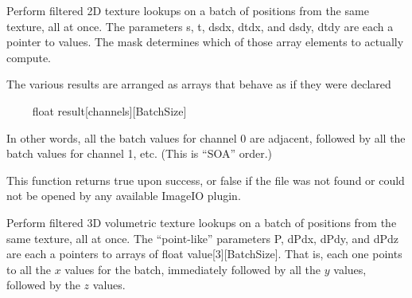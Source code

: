 Perform filtered 2D texture lookups on a batch of positions from the
same texture, all at once.  The parameters {\cf s},
{\cf t}, {\cf dsdx}, {\cf dtdx}, and {\cf dsdy}, {\cf dtdy} are each
a pointer to {\cf [BatchSize]} values.  The {\cf mask} determines which
of those array elements to actually compute.

The various results are arranged as arrays that behave as if they were
declared

~~~~ {\cf  float result[channels][BatchSize]}

\noindent In other words, all the batch values for channel 0 are
adjacent, followed by all the batch values for channel 1, etc. (This is
``SOA'' order.)

This function returns {\cf true} upon success, or {\cf false} if the
file was not found or could not be opened by any available ImageIO
plugin.
\apiend


Perform filtered 3D volumetric texture lookups on a batch of positions from
the same texture, all at once. The ``point-like'' parameters {\cf P}, {\cf
dPdx}, {\cf dPdy}, and {\cf dPdz} are each a pointers to arrays of
{\cf float value[3][BatchSize]}. That is, each one points to all the $x$ values
for the batch, immediately followed by all the $y$ values, followed by the
$z$ values.

